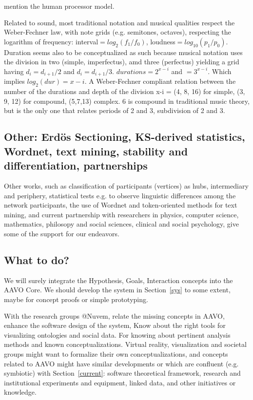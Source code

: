 \documentclass[letterpaper,10pt]{article}
\begin{document}
	mention the human processor model.


	Related to sound, most traditional notation and musical qualities
	respect the Weber-Fechner law, with note grids (e.g. semitones, octaves),
	respecting the logarithm of frequency: interval$=log_2(f_1/f_0)$,
	loudness$=log_10(p_1/p_0)$.
	Duration seems also to be conceptualized as such
	because musical notation uses the division in two (simple, imperfectus),
	amd three (perfectus) yielding a grid having
	$d_i=d_{i+1}/2$ and $d_i=d_{i+1}/3$.
	$durations=2^{x-i}$ and $=3^{x-i}$.
	Which implies $log_2(dur) = x-i$.
	A Weber-Fechner compliant relation
	between the number of the durations and
	depth of the division x-i = (4, 8, 16) for simple,
	(3, 9, 12) for compound,
	(5,7,13) complex.
	6 is compound in traditional music theory,
	but is the only one that relates periods of 2 and 3,
	subdivision of 2 and 3.



\subsection{Other: Erdös Sectioning, KS-derived statistics, Wordnet,
text mining, stability and differentiation, partnerships}
Other works, such as classification of participants (vertices) as
hubs, intermediary and periphery, statistical tests e.g. to
observe linguistic differences among the network participants,
the use of Wordnet and token-oriented methods for text mining,
and current partnership with researchers in physics, computer science,
mathematics, philosopy and social sciences, clinical and social psychology,
give some of the support for our endeavors.

\subsection{What to do?}
We will surely integrate the Hypothesis, Goals, Interaction
concepts into the AAVO Core.
We should develop the system in Section~\ref{sys} to some extent,
maybe for concept proofs or simple prototyping.

With the research groups @Nuvem, 
relate the missing concepts in AAVO,
enhance the software design of the system,
Know about the right tools for visualizing
ontologies and social data.
For knowing about pertinent analysis methods
and known conceptualizations.
Virtual reality, visualization and societal groups
might want to formalize their own conceptualizations,
and concepts related to AAVO might have similar developments
or which are confluent (e.g. symbiotic)
with Section~\ref{current}: software
theoretical framework, research and institutional experiments and equipment,
linked data, and other initiatives or knowledge.
\end{document}
